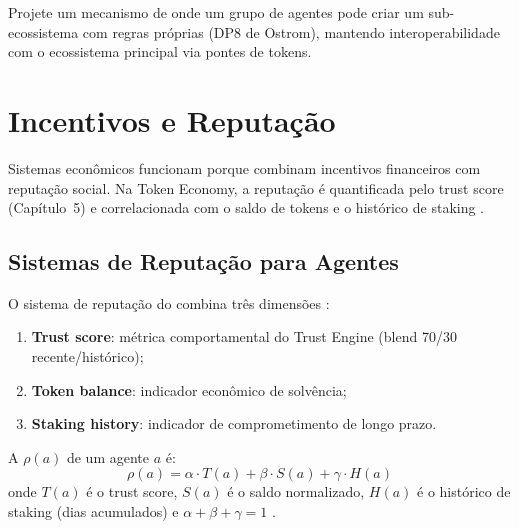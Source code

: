\begin{exercicio}
Projete um mecanismo de  onde um grupo de
agentes pode criar um sub-ecossistema com regras próprias (DP8
de Ostrom), mantendo interoperabilidade com o ecossistema
principal via pontes de tokens.
\end{exercicio}

\section{Incentivos e Reputação}
\label{sec:incentivos-reputacao}
\nivelavancado

Sistemas econômicos funcionam porque combinam incentivos
financeiros com reputação social. Na Token Economy, a reputação
é quantificada pelo trust score (Capítulo~5) e correlacionada
com o saldo de tokens e o histórico de staking
\cite{opencode2026token, opencode2026spec038}.

\subsection{Sistemas de Reputação para Agentes}

O sistema de reputação do \opencodeeco{} combina três dimensões
\cite{opencode2026token, opencode2026ecosystem}:

\begin{enumerate}
\item \textbf{Trust score}: métrica comportamental do Trust
Engine (blend 70/30 recente/histórico);
\item \textbf{Token balance}: indicador econômico de solvência;
\item \textbf{Staking history}: indicador de comprometimento
de longo prazo.
\end{enumerate}

\begin{definicao}
A  $\rho(a)$ de um agente $a$ é:
\[
\rho(a) = \alpha \cdot T(a) + \beta \cdot S(a) + \gamma \cdot H(a)
\]
onde $T(a)$ é o trust score, $S(a)$ é o saldo normalizado,
$H(a)$ é o histórico de staking (dias acumulados) e
$\alpha + \beta + \gamma = 1$ \cite{opencode2026token}.
\end{definicao}

